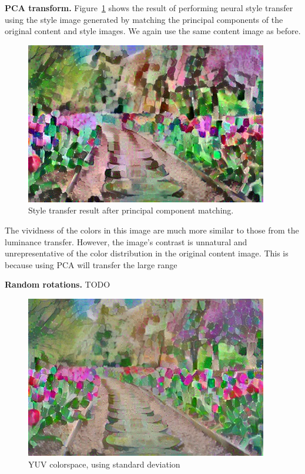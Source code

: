 \documentclass[10pt,twocolumn,letterpaper]{article}
\begin{document}
\bigbreak\noindent\textbf{PCA transform.}
Figure~\ref{fig:pca-result} shows the result of performing neural style transfer using the style image generated by matching the principal components of the original content and style images. We again use the same content image as before.

\begin{figure}[ht]
\centering
\includegraphics[width=0.98\linewidth]{imgs/flowers-rgb-pca.jpg}
\caption{Style transfer result after principal component matching.}
\label{fig:pca-result}
\end{figure}

The vividness of the colors in this image are much more similar to those from the luminance transfer. However, the image's contrast is unnatural and unrepresentative of the color distribution in the original content image. This is because using PCA will transfer the large range

\bigbreak\noindent\textbf{Random rotations.}
TODO

\begin{figure}[ht]
\centering
\includegraphics[width=0.98\linewidth]{imgs/flowers-rgb-rot.jpg}
\caption{YUV colorspace, using standard deviation}
\label{fig:rot-result}
\end{figure}
\end{document}
